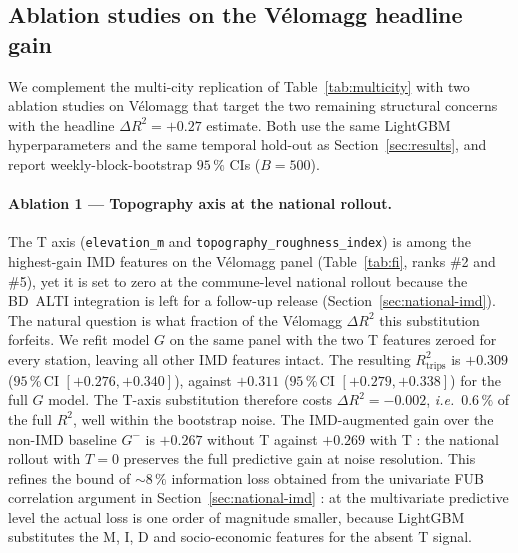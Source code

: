 \documentclass[11pt,a4paper]{article}
\begin{document}
\subsection{Ablation studies on the V\'elomagg headline gain}
\label{sec:ablations}

We complement the multi-city replication of Table~\ref{tab:multicity}
with two ablation studies on V\'elomagg that target the two
remaining structural concerns with the headline
$\Delta R^2 = +0.27$ estimate.  Both use the same LightGBM
hyperparameters and the same temporal hold-out as
Section~\ref{sec:results}, and report weekly-block-bootstrap
$95\,\%$ CIs ($B = 500$).

\paragraph{Ablation 1 — Topography axis at the national rollout.}
The T axis (\texttt{elevation\_m} and
\texttt{topography\_roughness\_index}) is among the highest-gain
IMD features on the V\'elomagg panel
(Table~\ref{tab:fi}, ranks \#2 and \#5), yet it is set to zero
at the commune-level national rollout because the BD~ALTI
integration is left for a follow-up release
(Section~\ref{sec:national-imd}).  The natural question is what
fraction of the V\'elomagg $\Delta R^2$ this substitution
forfeits.  We refit model $G$ on the same panel with the two T
features zeroed for every station, leaving all other IMD
features intact.  The resulting $R^2_{\mathrm{trips}}$ is
$+0.309$ ($95\,\%$\,CI $[+0.276, +0.340]$), against $+0.311$
($95\,\%$\,CI $[+0.279, +0.338]$) for the full $G$ model.  The
T-axis substitution therefore costs $\Delta R^2 = -0.002$,
\emph{i.e.}\ $0.6\,\%$ of the full $R^2$, well within the
bootstrap noise.  The IMD-augmented gain over the non-IMD
baseline $G^-$ is $+0.267$ without T against $+0.269$ with T :
the national rollout with $T = 0$ preserves the full predictive
gain at noise resolution.  This refines the bound of
$\sim 8\,\%$ information loss obtained from the univariate FUB
correlation argument in Section~\ref{sec:national-imd} : at the
multivariate predictive level the actual loss is one order of
magnitude smaller, because LightGBM substitutes the M, I, D and
socio-economic features for the absent T signal.
\end{document}
